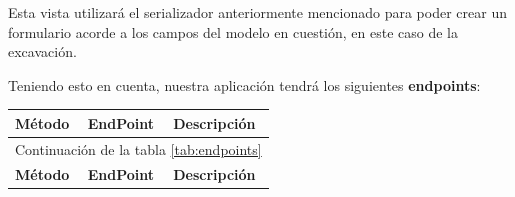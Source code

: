\begin{itemize}
        Esta vista utilizará el serializador anteriormente mencionado para poder crear
        un formulario acorde a los campos del modelo en cuestión, en este caso de la
        excavación.
    \end{itemize}

Teniendo esto en cuenta, nuestra aplicación tendrá los siguientes \textbf{endpoints}:

\begin{longtable}[H]{|l|l|l|}
    \hline
    \textbf{Método} & \textbf{EndPoint} & \textbf{Descripción} \\
    \hline
    \endfirsthead
   
    \hline
    \multicolumn{3}{|c|}{Continuación de la tabla \ref{tab:endpoints}}\\
    \hline
    \textbf{Método} & \textbf{EndPoint} & \textbf{Descripción} \\
    \hline
    \hline
    \endhead
   

\end{longtable}
